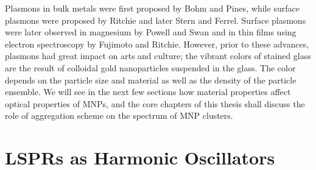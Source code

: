 \documentclass [11pt, proquest] {uwthesis}[2016/11/22]
\begin{document}
Plasmons in bulk metals were first proposed by Bohm and Pines\cite{BohmPines1,BohmPines2,BohmPines3}, while surface plasmons were proposed by Ritchie and later Stern and Ferrel\cite{SternFerrel}. Surface plasmons were later observed in magnesium by Powell and Swan\cite{PowellSwan} and in thin films using electron spectroscopy by Fujimoto\cite{Fujimoto} and Ritchie\cite{Ritchie}. However, prior to these advances, plasmons had great impact on arts and culture; the vibrant colors of stained glass are the result of colloidal gold nanoparticles suspended in the glass\cite{stainedglass}. The color depends on the particle size and material as well as the density of the particle ensemble. We will see in the next few sections how material properties affect optical properties of MNPs, and the core chapters of this thesis shall discuss the role of aggregation scheme on the spectrum of MNP clusters.

\section{LSPRs as Harmonic Oscillators}
\end{document}
